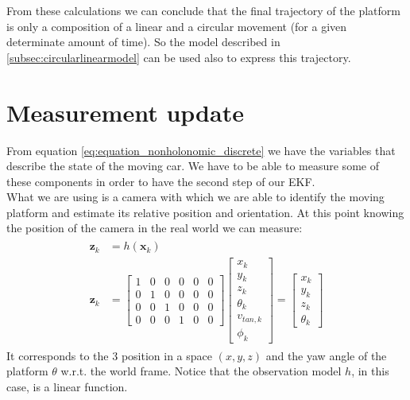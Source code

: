 From these calculations we can conclude that the final trajectory of the platform is only a composition of a linear and a circular movement (for a given determinate amount of time). So the model described in \ref{subsec:circularlinearmodel} can be used also to express this trajectory.

\newpage
\section{Measurement update}
From equation \ref{eq:equation_nonholonomic_discrete} we have the variables that describe the state of the moving car. We have to be able to measure some of these components in order to have the second step of our EKF. \\
What we are using is a camera with which we are able to identify the moving platform and estimate its relative position and orientation. At this point knowing the position of the camera in the real world we can measure:
\begin{align}
\begin{split}
\boldsymbol{z}_k &= h(\boldsymbol{x}_k) \\[10pt]
\boldsymbol{z}_k &=
\begin{bmatrix}
1 & 0 & 0 & 0 & 0 & 0 \\[10pt]
0 & 1 & 0 & 0 & 0 & 0  \\[10pt]
0 & 0 & 1 & 0 & 0 & 0 \\[10pt]
0 & 0 & 0 & 1 & 0 & 0
\end{bmatrix} 
\begin{bmatrix}
x_k \\[5pt]
y_k  \\[5pt]
z_k \\[5pt]
\theta_k \\[5pt]
v_{tan,k} \\[5pt]
\phi_k
\end{bmatrix} = \begin{bmatrix}
x_k  \\[10pt]
y_k  \\[10pt]
z_k \\[10pt]
\theta_k
\end{bmatrix}
\label{eq:realmeasure}
\end{split}
\end{align}
It corresponds to the 3 position in a space $(x,y,z)$ and the yaw angle of the platform $\theta$ w.r.t. the world frame.
Notice that the observation model $h$, in this case, is a linear function.


